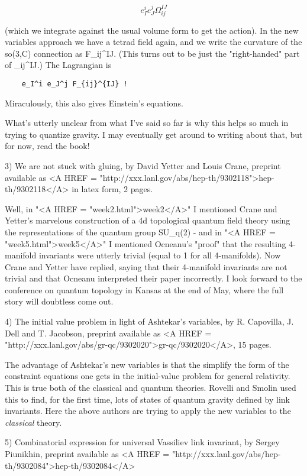 $$
       e_I^i e_J^j \Omega _{ij}^{IJ}
$$
    

(which we integrate against the usual volume form to get the action).  
In the new variables approach we have a tetrad field again, and we write
the curvature of the so(3,C) connection as F_{ij}^{IJ}.  (This turns out
to be just the "right-handed" part of \Omega _{ij}^{IJ}.)  The Lagrangian
is

\begin{verbatim}
	e_I^i e_J^j F_{ij}^{IJ} !
\end{verbatim}
    

Miraculously, this also gives Einstein's equations.  

What's utterly unclear from what I've said so far is why this helps so
much in trying to quantize gravity.  I may eventually get around to
writing about that, but for now, read the book!

3)  We are not stuck with gluing, by David Yetter and Louis Crane, preprint
available as <A HREF = "http://xxx.lanl.gov/abs/hep-th/9302118">hep-th/9302118</A> in latex form, 2 pages.

Well, in "<A HREF = "week2.html">week2</A>" I mentioned Crane and Yetter's marvelous construction of
a 4d topological quantum field theory using the representations of
the quantum group SU_q(2) - and in "<A HREF = "week5.html">week5</A>" I mentioned Ocneanu's "proof"
that the resulting 4-manifold invariants were utterly trivial (equal to
1 for all 4-manifolds).  Now Crane and Yetter have replied, saying that
their 4-manifold invariants are not trivial and that Ocneanu interpreted
their paper incorrectly.  I look forward to the conference on quantum
topology in Kansas at the end of May, where the full story will
doubtless come out.

4)  The initial value problem in light of Ashtekar's variables, by 
R. Capovilla, J. Dell and T. Jacobson, preprint available as
<A HREF = "http://xxx.lanl.gov/abs/gr-qc/9302020">gr-qc/9302020</A>, 15 pages.

The advantage of Ashtekar's new variables is that the simplify the form
of the constraint equations one gets in the initial-value problem for
general relativity.  This is true both of the classical and quantum
theories.  Rovelli and Smolin used this to find, for the first time,
lots of states of quantum gravity defined by link invariants.  Here the
above authors are trying to apply the new variables to the \emph{classical}
theory.  

5)  Combinatorial expression for universal Vassiliev link invariant, by
Sergey Piunikhin, preprint available as <A HREF = "http://xxx.lanl.gov/abs/hep-th/9302084">hep-th/9302084</A>

